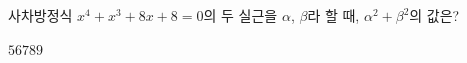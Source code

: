 사차방정식 $x^4+x^3+8x+8=0$의 두 실근을 $\alpha$, $\beta$라 할 때, $\alpha^2+\beta^2$의 값은?
\begin{choices32}{$5$}{$6$}{$7$}{$8$}{$9$}\end{choices32}

